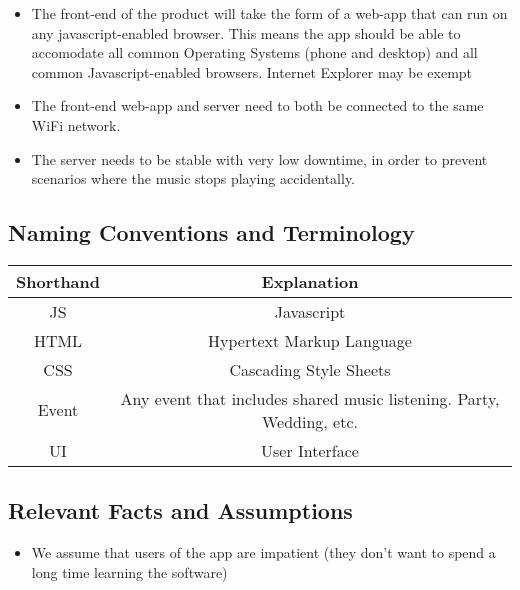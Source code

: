 \documentclass[12pt, titlepage]{article}
\begin{document}
\begin{itemize}
\item The front-end of the product will take the form of a web-app that can
run on any javascript-enabled browser. This means the app should be able to
accomodate all common Operating Systems (phone and desktop) and all
common Javascript-enabled browsers. Internet Explorer may be exempt\\
\item The front-end web-app and server need to both be connected to the same
WiFi network.\\
\item The server needs to be stable with very low downtime, in order to prevent
scenarios where the music stops playing accidentally.\\
\end{itemize}

\subsection{Naming Conventions and Terminology}
\begin{table}
\centering
\begin{tabular}{ c | c }
\textbf{Shorthand} & \textbf{Explanation}\\ \hline
JS & Javascript\\ 
HTML & Hypertext Markup Language\\ 
CSS & Cascading Style Sheets\\ 
Event & Any event that includes shared music listening. Party, Wedding, etc. \\ 
UI & User Interface\\
\end{tabular}
\end{table}
\subsection{Relevant Facts and Assumptions}

\begin{itemize}
\item We assume that users of the app are impatient (they don't want to spend a
long time learning the software)
\end{itemize}
\end{document}
